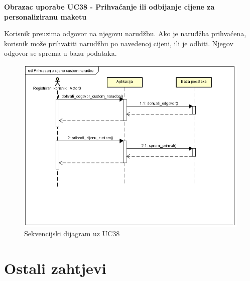 				\textbf{Obrazac uporabe UC38 - Prihvaćanje ili odbijanje cijene za personaliziranu maketu}
				
				Korisnik preuzima odgovor na njegovu narudžbu. Ako je naruđžba prihvaćena, korisnik može prihvatiti narudžbu po navedenoj cijeni, ili je odbiti. Njegov odgovor se sprema u bazu podataka.
				
				\begin{figure} [!h]
					\centering
					\includegraphics[scale=0.65]{"slike/seqdiag_03"}
					\caption{Sekvencijski dijagram uz UC38}
					\label{fig:seqdiag_03}
				\end{figure}
				\pagebreak
				
				
				\eject
	
		\section{Ostali zahtjevi}
		

